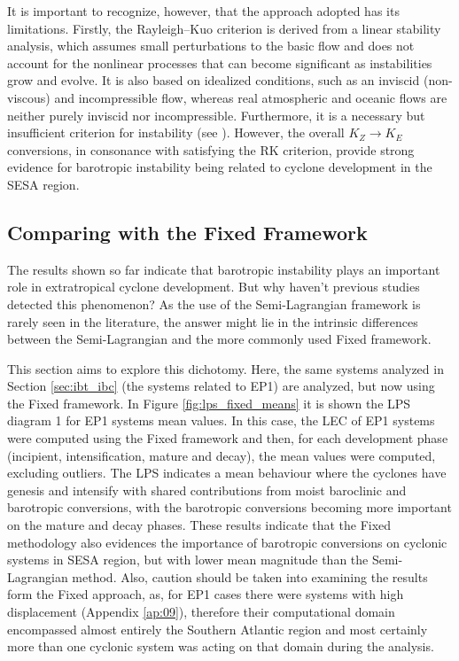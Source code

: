 It is important to recognize, however, that the approach adopted has its limitations. Firstly, the Rayleigh–Kuo criterion is derived from a linear stability analysis, which assumes small perturbations to the basic flow and does not account for the nonlinear processes that can become significant as instabilities grow and evolve. It is also based on idealized conditions, such as an inviscid (non-viscous) and incompressible flow, whereas real atmospheric and oceanic flows are neither purely inviscid nor incompressible. Furthermore, it is a necessary but insufficient criterion for instability (see \citet{read2020baroclinic}). However, the overall $K_Z \rightarrow K_E$ conversions, in consonance with satisfying the RK criterion, provide strong evidence for barotropic instability being related to cyclone development in the SESA region.

\subsection{Comparing with the Fixed Framework}

The results shown so far indicate that barotropic instability plays an important role in extratropical cyclone development. But why haven't previous studies detected this phenomenon? As the use of the Semi-Lagrangian framework is rarely seen in the literature, the answer might lie in the intrinsic differences between the Semi-Lagrangian and the more commonly used Fixed framework.

This section aims to explore this dichotomy. Here, the same systems analyzed in Section \ref{sec:ibt_ibc} (the systems related to EP1) are analyzed, but now using the Fixed framework. In Figure \ref{fig:lps_fixed_means} it is shown the LPS diagram 1 for EP1 systems mean values. In this case, the LEC of EP1 systems were computed using the Fixed framework and then, for each development phase (incipient, intensification, mature and decay), the mean values were computed, excluding outliers. The LPS indicates a mean behaviour where the cyclones have genesis and intensify with shared contributions from moist baroclinic and barotropic conversions, with the barotropic conversions becoming more important on the mature and decay phases. These results indicate that the Fixed methodology also evidences the importance of barotropic conversions on cyclonic systems in SESA region, but with lower mean magnitude than the Semi-Lagrangian method. Also, caution should be taken into examining the results form the Fixed approach, as, for EP1 cases there were systems with high displacement (Appendix \ref{ap:09}), therefore their computational domain encompassed almost entirely the Southern Atlantic region and most certainly more than one cyclonic system was acting on that domain during the analysis.

